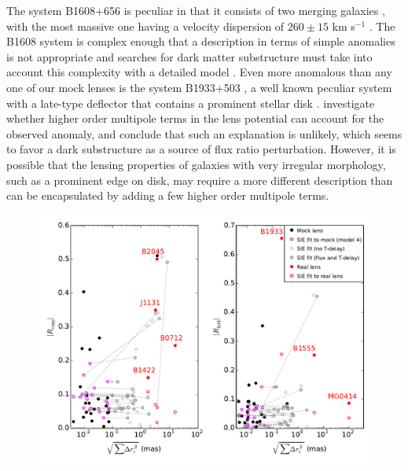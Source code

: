 \begin{itemize}
	The system B1608+656 \cite{Fas++96} is peculiar in that it consists of two merging galaxies \cite{Fas++02,Koo++03}, with the most massive one having a velocity dispersion of $260\pm15$ km s$^{-1}$ \cite{Suy++10}. The B1608 system is complex enough that a  description in terms of simple anomalies is not appropriate and searches for dark matter substructure must take into account this complexity with a detailed model \cite{Suy++09,Suy++10}. 
	Even more anomalous than any one of our mock lenses is the system B1933+503 \cite{Syk++98}, a well known peculiar system with a late-type deflector that contains a prominent stellar disk \cite{Suy++12b}. \cite{K+D04} investigate whether higher order multipole terms in the lens potential can account for the observed anomaly, and conclude that such an explanation is unlikely, which seems to favor a dark substructure as a source of flux ratio perturbation. However, it is possible that the lensing properties of galaxies with very irregular morphology, such as a prominent edge on disk, may require a more different description than can be encapsulated by adding a few higher order multipole terms.
	\begin{figure}
		\includegraphics[trim=0cm .5cm 0cm .4cm,clip,width=.7\textwidth]{./figures_sls/poserror_vs_Rcuspfold_withlines-eps-converted-to.pdf}

\end{figure}
\end{itemize}
